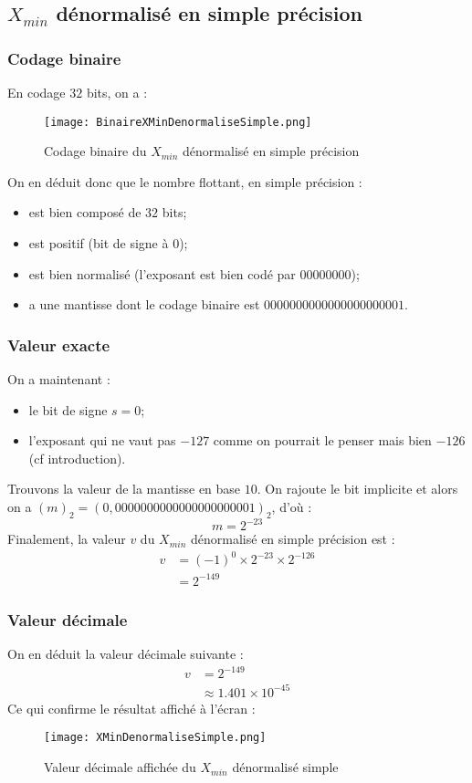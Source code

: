 \documentclass[a4paper, titlepage]{livret} %
\begin{document}
			\subsection{$X_{min}$ dénormalisé en simple précision}
				\subsubsection{Codage binaire}
					En codage $32$ bits, on a :
					\begin{figure}[!h]
						\centering
  							\texttt{[image: BinaireXMinDenormaliseSimple.png]}
  							\caption{Codage binaire du $X_{min}$ dénormalisé en simple précision}
					\end{figure}

					On en déduit donc que le nombre flottant, en simple précision :
					\begin{itemize}
						\item est bien composé de $32$ bits;
						\item est positif (bit de signe à 0);
						\item est bien normalisé (l'exposant est bien codé par $00000000$);
						\item a une mantisse dont le codage binaire est $00000000 00000000 000001$.
					\end{itemize}

				\subsubsection{Valeur exacte}
					On a maintenant : 
					\begin{itemize}
						\item le bit de signe $s = 0$;
						\item l'exposant qui ne vaut pas $-127$ comme on pourrait le penser mais bien $-126$ (cf introduction).
					\end{itemize}
					Trouvons la valeur de la mantisse en base $10$.
					On rajoute le bit implicite et alors on a $(m)_{2} = (0,00000000 00000000 000001)_{2}$, d'où :
					\[
						m = 2^{-23}
					\]
					Finalement, la valeur $v$ du $X_{min}$ dénormalisé en simple précision est :
					\[\begin{aligned}
						v & = (-1)^{0} \times 2^{-23} \times 2^{-126}\\
						  & = 2^{-149}
					\end{aligned}\]

				\subsubsection{Valeur décimale}
					On en déduit la valeur décimale suivante :
					\[\begin{aligned}
						v & = 2^{-149}\\
						  & \approx 1.401 \times 10^{-45}
					\end{aligned}\]
					Ce qui confirme le résultat affiché à l'écran :
					\begin{figure}[!h]
						\centering
  							\texttt{[image: XMinDenormaliseSimple.png]}
  							\caption{Valeur décimale affichée du $X_{min}$ dénormalisé simple}
					\end{figure}
\end{document}
